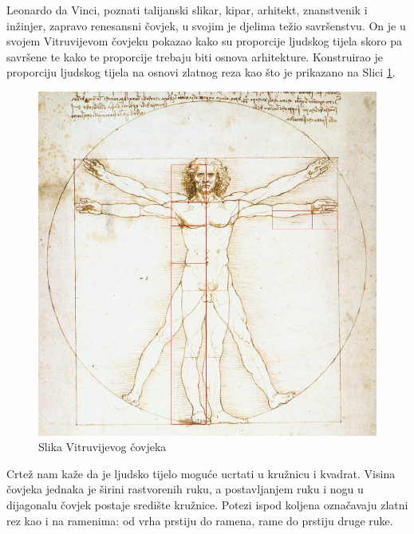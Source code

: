\documentclass[14pt]{scrartcl}
\begin{document}
Leonardo da Vinci, poznati talijanski slikar, kipar, arhitekt, znanstvenik i in\v{z}injer, zapravo renesansni \v{c}ovjek, u svojim je djelima te\v{z}io savr\v{s}enstvu.
On je u svojem Vitruvijevom \v{c}ovjeku pokazao kako su proporcije ljudskog tijela skoro pa savr\v{s}ene te kako te proporcije trebaju biti osnova arhitekture. Konstruirao je proporciju ljudskog tijela na osnovi zlatnog reza kao \v{s}to je prikazano na Slici \ref{fig:vitruvi}.\\
\begin{figure}[hb!]
\begin{center}
\includegraphics[scale=0.5]{Vitruvi.jpg}
\end{center}
\caption{Slika Vitruvijevog čovjeka}
\label{fig:vitruvi}
\end{figure}
\newpage
Crte\v{z} nam ka\v{z}e da je ljudsko tijelo mogu\'{c}e ucrtati u kru\v{z}nicu i kvadrat. Visina \v{c}ovjeka jednaka je \v{s}irini rastvorenih ruku, a postavljanjem ruku i nogu u dijagonalu \v{c}ovjek postaje sredi\v{s}te kru\v{z}nice. Potezi ispod koljena ozna\v{c}avaju zlatni rez kao i na ramenima: od vrha prstiju do ramena, rame do prstiju druge ruke.\\
\end{document}

